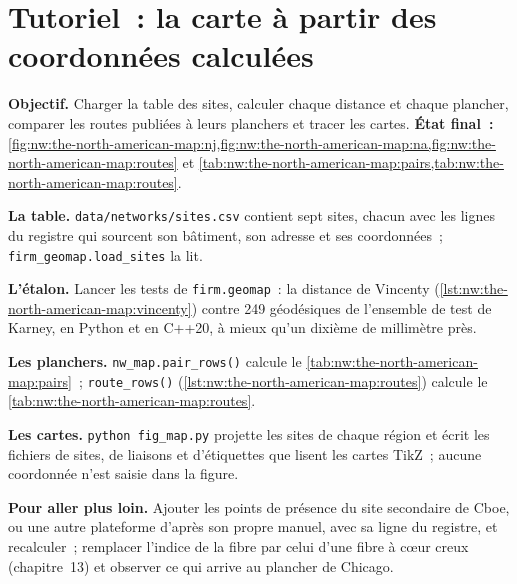 \label{lst:nw:the-north-american-map:vincenty}

\section{Tutoriel~: la carte à partir des coordonnées calculées}\label{tut:nw:the-north-american-map:tut}

\begin{tutorial}
\textbf{Objectif.} Charger la table des sites, calculer chaque distance et chaque plancher, comparer les routes publiées à leurs planchers et tracer les cartes.
\textbf{État final~:} \cref{fig:nw:the-north-american-map:nj,fig:nw:the-north-american-map:na,fig:nw:the-north-american-map:routes} et
\cref{tab:nw:the-north-american-map:pairs,tab:nw:the-north-american-map:routes}.
\begin{tutsteps}
\item \textbf{La table.} \texttt{data/networks/sites.csv} contient sept sites, chacun avec les lignes du registre qui sourcent son bâtiment, son adresse et
  ses coordonnées~; \texttt{firm\_geomap.load\_sites} la lit.
\item \textbf{L'étalon.} Lancer les tests de \texttt{firm.geomap}~: la distance de Vincenty
  (\cref{lst:nw:the-north-american-map:vincenty}) contre 249 géodésiques de l'ensemble de test de Karney, en Python et en C++20, à mieux qu'un dixième
  de millimètre près.
\item \textbf{Les planchers.} \texttt{nw\_map.pair\_rows()} calcule le \cref{tab:nw:the-north-american-map:pairs}~; \texttt{route\_rows()}
  (\cref{lst:nw:the-north-american-map:routes}) calcule le \cref{tab:nw:the-north-american-map:routes}.
\item \textbf{Les cartes.} \texttt{python fig\_map.py} projette les sites de chaque région et écrit les fichiers de sites, de liaisons et d'étiquettes que lisent les cartes TikZ~;
  aucune coordonnée n'est saisie dans la figure.
\end{tutsteps}
\textbf{Pour aller plus loin.} Ajouter les points de présence du site secondaire de Cboe, ou une autre plateforme d'après son propre manuel, avec sa ligne du registre, et
recalculer~; remplacer l'indice de la fibre par celui d'une fibre à cœur creux (chapitre~13) et observer ce qui arrive au plancher de Chicago.
\end{tutorial}

